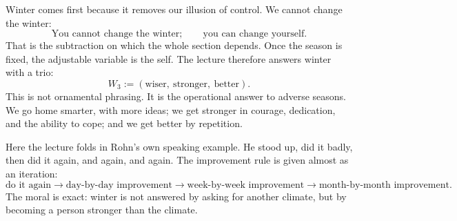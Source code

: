 \begin{figure}
\begin{center}
\end{center}
\end{figure}

Winter comes first because it removes our illusion of control. We cannot change the winter:
\begin{equation}
\text{You cannot change the winter};\qquad \text{you can change yourself}.
\end{equation}
That is the subtraction on which the whole section depends. Once the season is fixed, the adjustable variable is the self. The lecture therefore answers winter with a trio:
\begin{equation}
W_3 := (\text{wiser},\ \text{stronger},\ \text{better}).
\end{equation}
This is not ornamental phrasing. It is the operational answer to adverse seasons. We go home smarter, with more ideas; we get stronger in courage, dedication, and the ability to cope; and we get better by repetition.

Here the lecture folds in Rohn's own speaking example. He stood up, did it badly, then did it again, and again, and again. The improvement rule is given almost as an iteration:
\begin{equation}
\text{do it again} \to \text{day-by-day improvement} \to \text{week-by-week improvement} \to \text{month-by-month improvement}.
\end{equation}
The moral is exact: winter is not answered by asking for another climate, but by becoming a person stronger than the climate.

